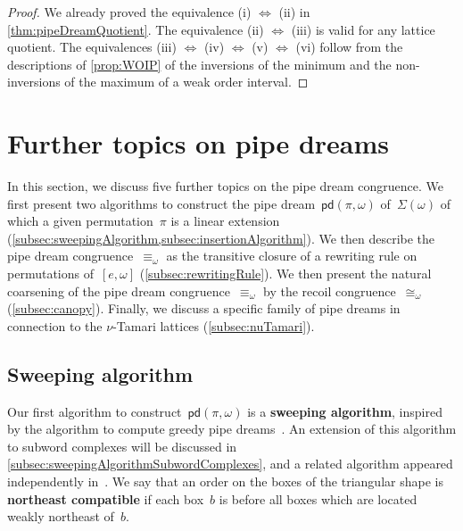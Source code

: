 \documentclass[reqno]{amsart}
\theoremstyle{definition}
\newcommand{\defn}[1]{\textbf{\textsf{\color{PineGreen} #1}}} %
\newcommand{\acyclicPipeDreams}{\Sigma} %
\newcommand{\insertion}[2]{\mathsf{pd}(#1,#2)} %
\begin{document}
\begin{proof}
We already proved the equivalence (i) $\Leftrightarrow$ (ii) in \cref{thm:pipeDreamQuotient}.
The equivalence (ii) $\Leftrightarrow$ (iii) is valid for any lattice quotient.
The equivalences (iii) $\Leftrightarrow$ (iv) $\Leftrightarrow$ (v) $\Leftrightarrow$ (vi) follow from the descriptions of \cref{prop:WOIP} of the inversions of the minimum and the non-inversions of the maximum of a weak order interval.
\end{proof}


\section{Further topics on pipe dreams}
\label{sec:furtherTopics}

In this section, we discuss five further topics on the pipe dream congruence.
We first present two algorithms to construct the pipe dream~$\insertion{\pi}{\omega}$ of~$\acyclicPipeDreams(\omega)$ of which a given permutation~$\pi$ is a linear extension (\cref{subsec:sweepingAlgorithm,subsec:insertionAlgorithm}).
We then describe the pipe dream congruence~$\equiv_\omega$ as the transitive closure of a rewriting rule on permutations of~$[e, \omega]$ (\cref{subsec:rewritingRule}).
We then present the natural coarsening of the pipe dream congruence~$\equiv_\omega$ by the recoil congruence~$\cong_\omega$ (\cref{subsec:canopy}).
Finally, we discuss a specific family of pipe dreams in connection to the $\nu$-Tamari lattices (\cref{subsec:nuTamari}).


\subsection{Sweeping algorithm}
\label{subsec:sweepingAlgorithm}

Our first algorithm to construct~$\insertion{\pi}{\omega}$ is a \defn{sweeping algorithm}, inspired by the algorithm to compute greedy pipe dreams~\cite{PilaudPocchiola, PilaudStump-ELlabelings}.
An extension of this algorithm to subword complexes will be discussed in \cref{subsec:sweepingAlgorithmSubwordComplexes}, and a related algorithm appeared independently in~\cite{JahnStump}.
We say that an order on the boxes of the triangular shape is \defn{northeast compatible} if each box~$b$ is before all boxes which are located weakly northeast of~$b$.
\end{document}
